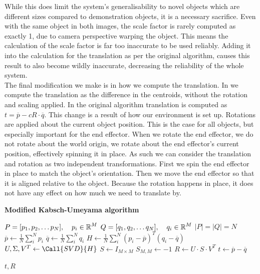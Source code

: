 While this does limit the system's generalisability to novel objects which are different sizes compared to demonstration objects, it is a necessary sacrifice. Even with the same object in both images, the scale factor is rarely computed as exactly 1, due to camera perspective warping the object. This means the calculation of the scale factor is far too inaccurate to be used reliably. Adding it into the calculation for the translation as per the original algorithm, causes this result to also become wildly inaccurate, decreasing the reliability of the whole system.\\

The final modification we make is in how we compute the translation. In  we compute the translation as the difference in the centroids, without the rotation and scaling applied. In the original algorithm translation is computed as $t = \overline{p} - cR \cdot \overline{q}$. This change is a result of how our environment is set up. Rotations are applied about the current object position. This is the case for all objects, but especially important for the end effector. When we rotate the end effector, we do not rotate about the world origin, we rotate about the end effector's current position, effectively spinning it in place. As such we can consider the translation and rotation as two independent transformations. First we spin the end effector in place to match the object's orientation. Then we move the end effector so that it is aligned relative to the object. Because the rotation happens in place, it does not have any effect on how much we need to translate by.\\

\begin{algorithm}
    \setlength{\baselineskip}{18pt}
    \caption{\textbf{Modified Kabsch-Umeyama algorithm}}
    \label{alg:modified-kabsch}
    \begin{algorithmic}[1]
        \Require $P = [p_1, p_2, \dots p_N], \operatorname{\: \: \: \:} p_i \in \operatorname{\mathbb{R}}^M$
        \Statex $Q = [q_1, q_2, \dots q_N], \operatorname{\: \: \: \:} q_i \in \operatorname{\mathbb{R}}^M$
        \Ensure $|P| = |Q| = N$
            \State $\overline{p} \gets \frac{1}{N}\sum^N_{i} p_i$
            \State $\overline{q} \gets \frac{1}{N}\sum^N_{i} q_i$
            \State $H \gets \frac{1}{N}\sum^N_{i} (p_i - \overline{p})^T(q_i - \overline{q})$ 
            \State $U, \Sigma, V^T \gets \Call{SVD}{H}$ 
            \State $S \gets I_{M \times M}$ 
                \State $S_{M,M} \gets -1$                 
            \EndIf
            \State $R \gets U \cdot S \cdot V^T$
            \State $t \gets \overline{p} - \overline{q} $
    
            \State \Output $t, R$
        \EndProcedure
        
    \end{algorithmic}
\end{algorithm}

